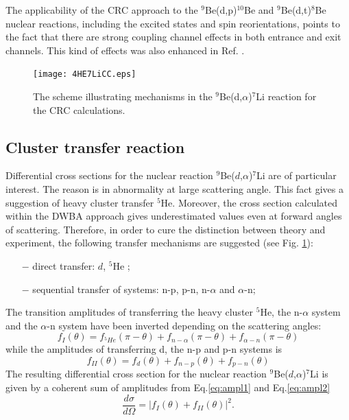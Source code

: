 \documentclass[10pt]{iopart}
\begin{document}
The applicability of the CRC approach to  the $^9$Be(d,p)$^{10}$Be and $^9$Be(d,t)$^{8}$Be nuclear reactions, including the excited states and spin reorientations, points to the fact that there are strong coupling channel effects in both entrance and exit channels. This kind  of effects was also enhanced in Ref. \cite{harakeh1980, rudchik2016}. 


\begin{figure}[tp]
\centering
\texttt{[image: 4HE7LiCC.eps]}
\caption{\label{4He7LICC} The scheme illustrating mechanisms in the $^9$Be(d,$\alpha$)$^7$Li reaction for the CRC calculations. }
\end{figure}	


\subsection{Cluster transfer reaction}
Differential cross sections for the nuclear reaction  ${^9}$Be($d$,$\alpha$)$^7$Li are of particular interest. The reason is in abnormality at large scattering angle. This fact gives a suggestion of heavy cluster transfer $^5$He. Moreover, the cross section calculated within the DWBA approach gives underestimated values even at forward angles of scattering. Therefore, in order to cure the distinction between theory and experiment, the following transfer mechanisms are suggested (see Fig. \ref{4He7LICC}): 
\begin{itemize}
\item[$-$] direct transfer: $d$, $^5$He ;
\item[$-$] sequential transfer of systems: n-p, p-n, n-$\alpha$ and $\alpha$-n;
\end{itemize}

The transition amplitudes of transferring  the heavy cluster $^5$He, the n-$\alpha$ system and the $\alpha$-n system have been inverted depending on the scattering angles:
\begin{equation}
\label{eq:ampl1}
f_{I}(\theta)=f_{^5He}(\pi - \theta) + f_{n-\alpha}(\pi - \theta) + f_{\alpha-n}(\pi - \theta) 
\end{equation}
while the amplitudes of transferring  d, the n-p  and  p-n systems is
\begin{equation}
\label{eq:ampl2}
f_{II}(\theta)=f_{d}(\theta) + f_{n-p}( \theta) + f_{p-n}(\theta) 
\end{equation} 
The resulting differential cross section for the nuclear reaction ${^9}$Be($d$,$\alpha$)$^7$Li is given by a coherent sum of amplitudes from Eq.\ref{eq:ampl1} and Eq.\ref{eq:ampl2}
\begin{equation}
\frac{d\sigma}{d\Omega}=\vert f_{I}(\theta) + f_{II}(\theta) \vert ^2.
\end{equation}
\end{document}
